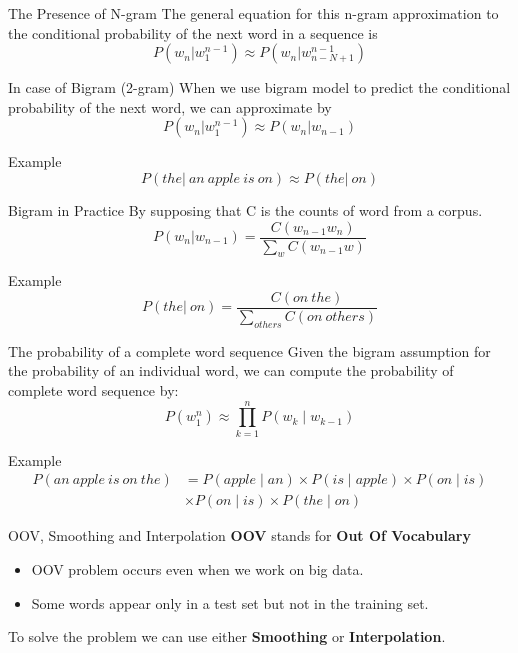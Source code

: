 \documentclass{beamer}
\begin{document}
\begin{frame}{The Presence of N-gram}
    The general equation for this n-gram approximation to the conditional probability of the next word in a sequence is
    $$P(w_n|w_1^{n-1}) \approx P(w_n|w_{n-N+1}^{n-1})$$
    \begin{block}{In case of Bigram (2-gram)}
        When we use bigram model to predict the conditional probability of the next word, we can approximate by
        $$P(w_n|w_1^{n-1}) \approx P(w_n|w_{n-1})$$
    \end{block}
    \begin{block}{Example}
        $$P(the|\ an\ apple\ is\ on) \approx P(the|\ on)$$
    \end{block}
\end{frame}


\begin{frame}{Bigram in Practice}
By supposing that C is the counts of word from a corpus.
    $$P(w_n|w_{n-1}) = \frac{C(w_{n-1}w_n)}{\sum_{w}C(w_{n-1}w)}$$
    \begin{block}{Example}
        $$P(the|\ on) = \frac{C(on\ the)}{\sum_{others}C(on\ others)}$$
    \end{block}
\end{frame}


\begin{frame}{The probability of a complete word sequence}
    Given the bigram assumption for the probability of an individual word, we can compute the probability of complete word sequence by:
    $$P(w_1^n) \approx \prod_{k=1}^nP(w_k\mid w_{k-1})$$
    \begin{block}{Example}
        \begin{align*}
            P(an\ apple\ is\ on\ the) &= P(apple\mid an) \times P(is\mid apple) \times P(on\mid is)\\
                                      &\times P(on\mid is) \times P(the\mid on)
        \end{align*}
    \end{block}

\end{frame}


\begin{frame}{OOV, Smoothing and Interpolation}
    \textbf{OOV} stands for \textbf{Out Of Vocabulary}\\
    \begin{itemize}
        \item OOV problem occurs even when we work on big data.
        \item Some words appear only in a test set but not in the training set.
    \end{itemize}
    To solve the problem we can use either \textbf{Smoothing} or \textbf{Interpolation}.
\end{frame}
\end{document}
